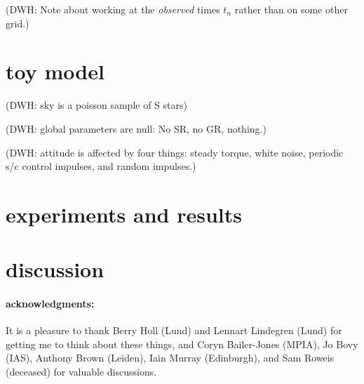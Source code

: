 \documentclass[12pt]{article}
\begin{document}
(DWH: Note about working at the \emph{observed} times $t_n$ rather
than on some other grid.)

\section{toy model}

(DWH: sky is a poisson sample of S stars)

(DWH: global parameters are null:  No SR, no GR, nothing.)

(DWH: attitude is affected by four things: steady torque, white noise,
periodic s/c control impulses, and random impulses.)

\section{experiments and results}

\section{discussion}

\paragraph{acknowledgments:}
It is a pleasure to thank Berry Holl (Lund) and Lennart Lindegren
(Lund) for getting me to think about these things, and Coryn
Bailer-Jones (MPIA), Jo Bovy (IAS), Anthony Brown (Leiden), Iain
Murray (Edinburgh), and Sam Roweis (deceased) for valuable
discussions.
\end{document}
